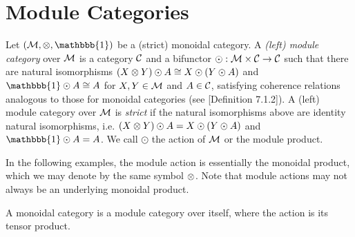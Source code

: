 \section{Module Categories}
\label{sec:2.3}


\begin{definition}
    Let $(\mcal{M}, \tensor, \mathbbb{1})$ be a (strict) monoidal category. A \textit{(left) module category} over $\mathcal{M}$ is a category $\mathcal{C}$ and a bifunctor $\odot: \mathcal{M} \times \mathcal{C} \to \mathcal{C}$ such that there are natural isomorphisms $(X \otimes Y) \odot A \cong X \odot (Y \odot A)$ and $\mathbbb{1} \odot A \cong A$ for $X,Y \in \mathcal{M}$ and $A \in \mathcal{C}$, satisfying coherence relations analogous to those for monoidal categories (see \cite{tensor-categories}[Definition 7.1.2]). A (left) module category over $\mathcal{M}$ is \textit{strict} if the natural isomorphisms above are identity natural isomorphisms, i.e. $(X \otimes Y) \odot A = X \odot (Y \odot A)$ and $\mathbbb{1} \odot A = A$. We call $\odot$ the action of $\mathcal{M}$ or the module product. 
\end{definition}

In the following examples, the module action is essentially the monoidal product, which we may denote by the same symbol $\otimes$. Note that module actions may not always be an underlying monoidal product.

\begin{example}
    A monoidal category is a module category over itself, where the action is its tensor product.
\end{example}

